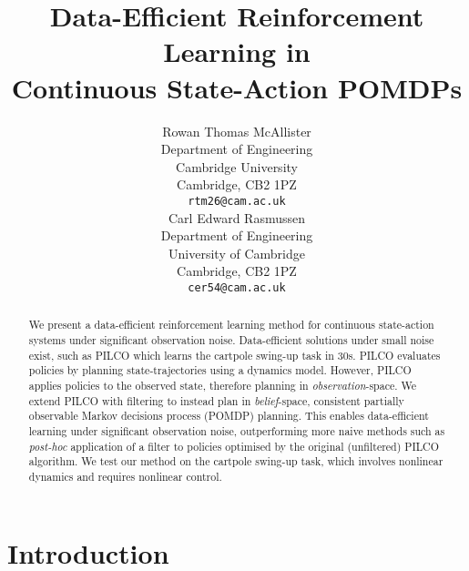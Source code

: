 \documentclass{article}
\title{Data-Efficient Reinforcement Learning in \\ Continuous State-Action POMDPs} %
\author{
Rowan Thomas McAllister\\
Department of Engineering\\
Cambridge University\\ %
Cambridge, CB2 1PZ\\
\texttt{rtm26@cam.ac.uk} \\
\And
Carl Edward Rasmussen \\
Department of Engineering\\
University of Cambridge\\
Cambridge, CB2 1PZ\\
\texttt{cer54@cam.ac.uk} \\
}
\begin{document}
\maketitle

\begin{abstract}

We present a data-efficient reinforcement learning
method for continuous state-action systems
under significant observation noise.
Data-efficient solutions under small noise exist,
such as PILCO which learns the cartpole swing-up task in 30s.
PILCO %
evaluates policies by planning state-trajectories using a dynamics model.
However, PILCO applies policies to the observed state,
therefore planning in \textit{observation}-space.
We extend PILCO with filtering to instead plan in \textit{belief}-space,
consistent partially observable Markov decisions process (POMDP) planning.
This enables data-efficient learning under significant observation noise,
outperforming more naive methods such as \textit{post-hoc} application of a filter to
policies optimised by the original (unfiltered) PILCO algorithm.
We test our method on the cartpole swing-up task, %
which involves nonlinear dynamics and requires nonlinear control.
\end{abstract}

\section{Introduction}
\end{document}
